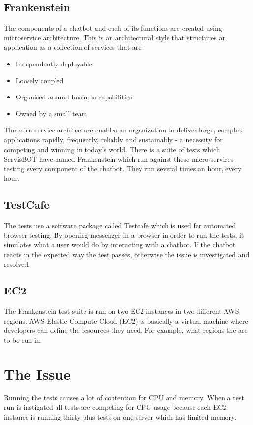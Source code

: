 \documentclass[12pt,a4paper,titlepage]{report}
\begin{document}
\subsection{Frankenstein}
The components of a chatbot and each of its functions are created using microservice architecture. This is an architectural style that structures an application as a collection of services that are:
\begin{itemize}
  \item Independently deployable
  \item Loosely coupled
  \item Organised around business capabilities
  \item Owned by a small team
\end{itemize}
The microservice architecture enables an organization to deliver large, complex applications rapidly, frequently, reliably and sustainably - a necessity for competing and winning in today's world. \autocite{Microservices}
There is a suite of tests which ServisBOT have named Frankenstein which run against these micro services testing every component of the chatbot. They run several times an hour, every hour. 
\subsection{TestCafe}
The tests use a software package called Testcafe which is used for automated browser testing.  By opening messenger in a browser in order to run the tests, it simulates what a user would do by interacting with a chatbot. If the chatbot reacts in the expected way the test passes, otherwise the issue is investigated and resolved.
\subsection{EC2}
The Frankenstein test suite is run on two EC2 instances in two different AWS regions. AWS Elastic Compute Cloud (EC2) is basically a virtual machine where developers can define the resources they need. For example, what regions the are to be run in. 
\section{The Issue}

Running the tests causes a lot of contention for CPU and memory. When a test run is instigated all tests are competing for CPU usage because each EC2 instance is running thirty plus tests on one server which has limited memory.
\end{document}
